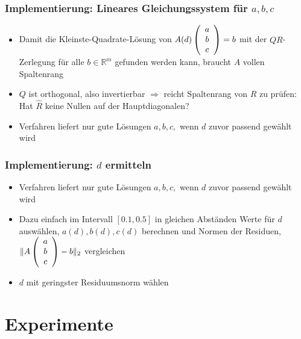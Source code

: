 \documentclass[a4paper, 11pt]{beamer}
\begin{document}
\begin{frame}
    \frametitle{Implementierung: Lineares Gleichungssystem für $a,b,c$}

    \begin{itemize}
        \item Damit die Kleinste-Quadrate-Lösung von $A(d) \left( \begin{array}{c} a \\ b \\ c \end{array} \right) = b$ mit der $QR$-Zerlegung für alle $b \in \mathbb{R}^m$ gefunden werden kann, braucht $A$ vollen Spaltenrang
        \item $Q$ ist orthogonal, also invertierbar $\Rightarrow$ reicht Spaltenrang von $R$ zu prüfen: Hat $\hat{R}$ keine Nullen auf der Hauptdiagonalen?
    \end{itemize}
    \vspace{0.2cm}
    \begin{itemize}
        \item Verfahren liefert nur gute Lösungen $a, b, c,$ wenn $d$ zuvor passend gewählt wird
    \end{itemize}
\end{frame}


\begin{frame}
    \frametitle{Implementierung: $d$ ermitteln}

    \begin{itemize}
        \item Verfahren liefert nur gute Lösungen $a,b,c,$ wenn $d$ zuvor passend gewählt wird
    \end{itemize}
    \vspace{0.2cm}
    \begin{itemize}
        \item Dazu einfach im Intervall $[0.1,0.5]$ in gleichen Abständen Werte für $d$ auswählen, $a(d),b(d),c(d)$ berechnen und Normen der Residuen, $\|A\left( \begin{array}{c} a \\ b \\ c \end{array} \right)-b\|_2$ vergleichen
        \item $d$ mit geringster Residuumsnorm wählen
    \end{itemize}

\end{frame}


\section{Experimente}
\end{document}
